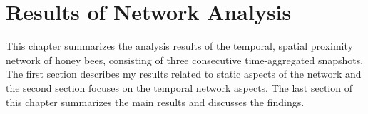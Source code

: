 \chapter{Results of Network Analysis}
\label{ch:results}
This chapter summarizes the analysis results of the temporal, spatial proximity network of honey bees, consisting of three consecutive time-aggregated snapshots.\\
The first section describes my results related to static aspects of the network and the second section focuses on the temporal network aspects.
The last section of this chapter summarizes the main results and discusses the findings.


\newpage

